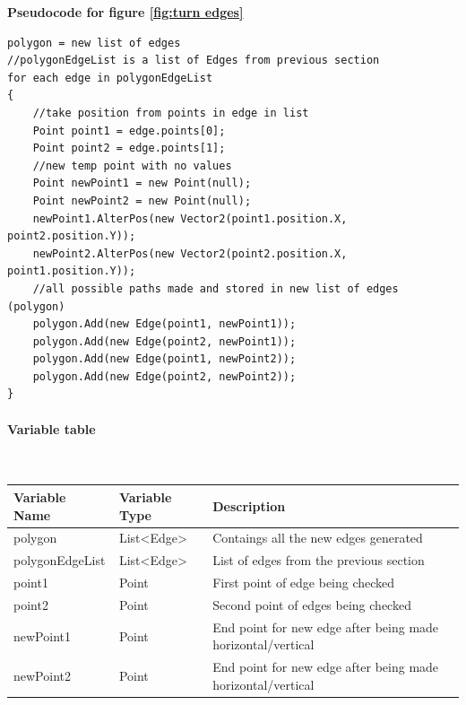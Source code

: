 \documentclass{article}
\newcommand{\myparagraph}[1]{\paragraph{#1}\mbox{}\\} %
\newcommand{\smallBr}{\vspace{1.5mm}}
\begin{document}
\pagebreak


\textbf{Pseudocode for figure \ref{fig:turn edges}}
\begin{lstlisting}
polygon = new list of edges
//polygonEdgeList is a list of Edges from previous section
for each edge in polygonEdgeList
{
	//take position from points in edge in list
    Point point1 = edge.points[0];
    Point point2 = edge.points[1];
    //new temp point with no values
    Point newPoint1 = new Point(null);
    Point newPoint2 = new Point(null);
    newPoint1.AlterPos(new Vector2(point1.position.X, point2.position.Y));
    newPoint2.AlterPos(new Vector2(point2.position.X, point1.position.Y));
    //all possible paths made and stored in new list of edges (polygon)
    polygon.Add(new Edge(point1, newPoint1));
    polygon.Add(new Edge(point2, newPoint1));
    polygon.Add(new Edge(point1, newPoint2));
    polygon.Add(new Edge(point2, newPoint2));
}
\end{lstlisting}

\myparagraph{Variable table}
\smallBr
\begin{tabular}{l|l|l}
Variable Name   & Variable Type                     & Description                                                 \\ \hline
polygon         & List\textless{}Edge\textgreater{} & Contaings all the new edges generated                       \\
polygonEdgeList & List\textless{}Edge\textgreater{} & List of edges from the previous section                     \\
point1          & Point                             & First point of edge being checked                           \\
point2          & Point                             & Second point of edges being checked                         \\
newPoint1       & Point                             & End point for new edge after being made horizontal/vertical \\
newPoint2       & Point                             & End point for new edge after being made horizontal/vertical
\end{tabular}
\end{document}
